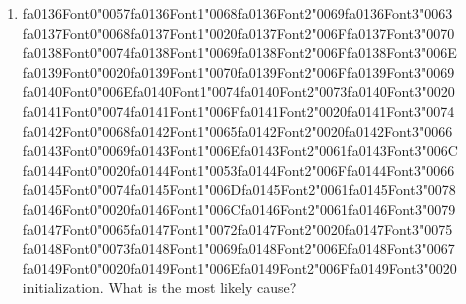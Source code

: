 \documentclass[12pt]{article}
\begin{document}
\begin{enumerate}[label=Q\arabic*.]
 \begin{enumerate}[label=(\Alph*)]
     \item BiLSTM
     \item Word2Vec + Decoder RNN
     \item Bag-of-Words + Naive Bayes
     \item Hidden Markov Models
 \end{enumerate}
 
 \item {\csname fa0136Font0\endcsname\char"0057}{\csname fa0136Font1\endcsname\char"0068}{\csname fa0136Font2\endcsname\char"0069}{\csname fa0136Font3\endcsname\char"0063} {\csname fa0137Font0\endcsname\char"0068}{\csname fa0137Font1\endcsname\char"0020}{\csname fa0137Font2\endcsname\char"006F}{\csname fa0137Font3\endcsname\char"0070} {\csname fa0138Font0\endcsname\char"0074}{\csname fa0138Font1\endcsname\char"0069}{\csname fa0138Font2\endcsname\char"006F}{\csname fa0138Font3\endcsname\char"006E} {\csname fa0139Font0\endcsname\char"0020}{\csname fa0139Font1\endcsname\char"0070}{\csname fa0139Font2\endcsname\char"006F}{\csname fa0139Font3\endcsname\char"0069} {\csname fa0140Font0\endcsname\char"006E}{\csname fa0140Font1\endcsname\char"0074}{\csname fa0140Font2\endcsname\char"0073}{\csname fa0140Font3\endcsname\char"0020} {\csname fa0141Font0\endcsname\char"0074}{\csname fa0141Font1\endcsname\char"006F}{\csname fa0141Font2\endcsname\char"0020}{\csname fa0141Font3\endcsname\char"0074} {\csname fa0142Font0\endcsname\char"0068}{\csname fa0142Font1\endcsname\char"0065}{\csname fa0142Font2\endcsname\char"0020}{\csname fa0142Font3\endcsname\char"0066} {\csname fa0143Font0\endcsname\char"0069}{\csname fa0143Font1\endcsname\char"006E}{\csname fa0143Font2\endcsname\char"0061}{\csname fa0143Font3\endcsname\char"006C} {\csname fa0144Font0\endcsname\char"0020}{\csname fa0144Font1\endcsname\char"0053}{\csname fa0144Font2\endcsname\char"006F}{\csname fa0144Font3\endcsname\char"0066} {\csname fa0145Font0\endcsname\char"0074}{\csname fa0145Font1\endcsname\char"006D}{\csname fa0145Font2\endcsname\char"0061}{\csname fa0145Font3\endcsname\char"0078} {\csname fa0146Font0\endcsname\char"0020}{\csname fa0146Font1\endcsname\char"006C}{\csname fa0146Font2\endcsname\char"0061}{\csname fa0146Font3\endcsname\char"0079} {\csname fa0147Font0\endcsname\char"0065}{\csname fa0147Font1\endcsname\char"0072}{\csname fa0147Font2\endcsname\char"0020}{\csname fa0147Font3\endcsname\char"0075} {\csname fa0148Font0\endcsname\char"0073}{\csname fa0148Font1\endcsname\char"0069}{\csname fa0148Font2\endcsname\char"006E}{\csname fa0148Font3\endcsname\char"0067} {\csname fa0149Font0\endcsname\char"0020}{\csname fa0149Font1\endcsname\char"006E}{\csname fa0149Font2\endcsname\char"006F}{\csname fa0149Font3\endcsname\char"0020} initialization. What is the most likely cause?

\end{enumerate}
\end{document}
